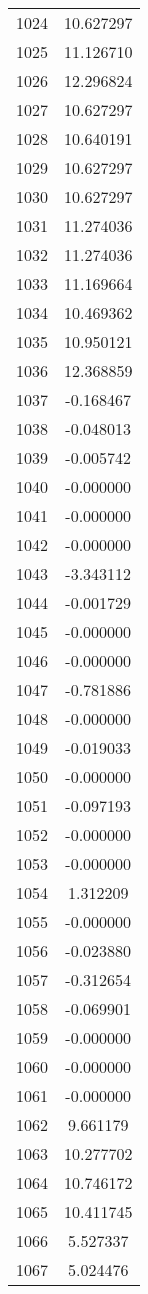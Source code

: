 \documentclass[12pt]{article}
\begin{document}
\begin{longtable}{@{}cc@{}}
1024 & 10.627297 \\
1025 & 11.126710 \\
1026 & 12.296824 \\
1027 & 10.627297 \\
1028 & 10.640191 \\
1029 & 10.627297 \\
1030 & 10.627297 \\
1031 & 11.274036 \\
1032 & 11.274036 \\
1033 & 11.169664 \\
1034 & 10.469362 \\
1035 & 10.950121 \\
1036 & 12.368859 \\
1037 & -0.168467 \\
1038 & -0.048013 \\
1039 & -0.005742 \\
1040 & -0.000000 \\
1041 & -0.000000 \\
1042 & -0.000000 \\
1043 & -3.343112 \\
1044 & -0.001729 \\
1045 & -0.000000 \\
1046 & -0.000000 \\
1047 & -0.781886 \\
1048 & -0.000000 \\
1049 & -0.019033 \\
1050 & -0.000000 \\
1051 & -0.097193 \\
1052 & -0.000000 \\
1053 & -0.000000 \\
1054 & 1.312209 \\
1055 & -0.000000 \\
1056 & -0.023880 \\
1057 & -0.312654 \\
1058 & -0.069901 \\
1059 & -0.000000 \\
1060 & -0.000000 \\
1061 & -0.000000 \\
1062 & 9.661179 \\
1063 & 10.277702 \\
1064 & 10.746172 \\
1065 & 10.411745 \\
1066 & 5.527337 \\
1067 & 5.024476 \\

\end{longtable}
\end{document}
